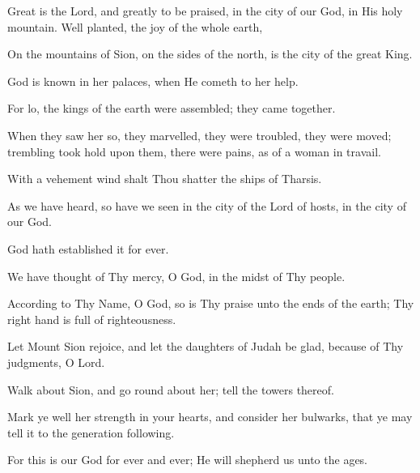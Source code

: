 Great is the Lord, and greatly to be praised, in the city of our God, in His holy mountain. Well planted, the joy of the whole earth,

On the mountains of Sion, on the sides of the north, is the city of the great King.

God is known in her palaces, when He cometh to her help.

For lo, the kings of the earth were assembled; they came together.

When they saw her so, they marvelled, they were troubled, they were moved; trembling took hold upon them, there were pains, as of a woman in travail.

With a vehement wind shalt Thou shatter the ships of Tharsis.

As we have heard, so have we seen in the city of the Lord of hosts, in the city of our God.

God hath established it for ever.

We have thought of Thy mercy, O God, in the midst of Thy people.

According to Thy Name, O God, so is Thy praise unto the ends of the earth; Thy right hand is full of righteousness.

Let Mount Sion rejoice, and let the daughters of Judah be glad, because of Thy judgments, O Lord.

Walk about Sion, and go round about her; tell the towers thereof.

Mark ye well her strength in your hearts, and consider her bulwarks, that ye may tell it to the generation following.

For this is our God for ever and ever; He will shepherd us unto the ages.
